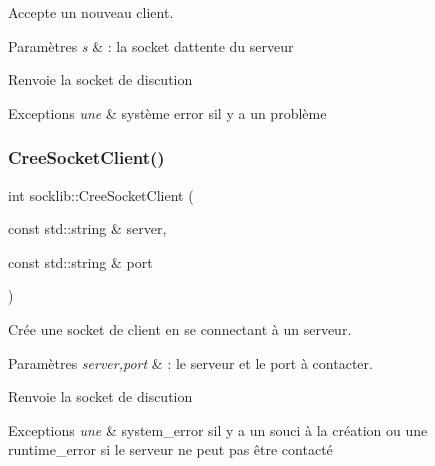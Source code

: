 Accepte un nouveau client. 


\begin{DoxyParams}{Paramètres}
{\em s} & \+: la socket d\textquotesingle{}attente du serveur \\
\hline
\end{DoxyParams}
\begin{DoxyReturn}{Renvoie}
la socket de discution 
\end{DoxyReturn}

\begin{DoxyExceptions}{Exceptions}
{\em une} & système error s\textquotesingle{}il y a un problème \\
\hline
\end{DoxyExceptions}
\mbox{\label{namespacesocklib_a426a4d6e2fbcf559659e88607f0473f7}} 
\subsubsection{\texorpdfstring{Cree\+Socket\+Client()}{CreeSocketClient()}}
{\footnotesize\ttfamily int socklib\+::\+Cree\+Socket\+Client (\begin{DoxyParamCaption}\item[{const std\+::string \&}]{server,  }\item[{const std\+::string \&}]{port }\end{DoxyParamCaption})}



Crée une socket de client en se connectant à un serveur. 


\begin{DoxyParams}{Paramètres}
{\em server,port} & \+: le serveur et le port à contacter. \\
\hline
\end{DoxyParams}
\begin{DoxyReturn}{Renvoie}
la socket de discution 
\end{DoxyReturn}

\begin{DoxyExceptions}{Exceptions}
{\em une} & system\+\_\+error s\textquotesingle{}il y a un souci à la création ou une runtime\+\_\+error si le serveur ne peut pas être contacté \\
\hline
\end{DoxyExceptions}
\mbox{\label{namespacesocklib_af229dcfe18deb451a8163a02ea5a3b06}} 

